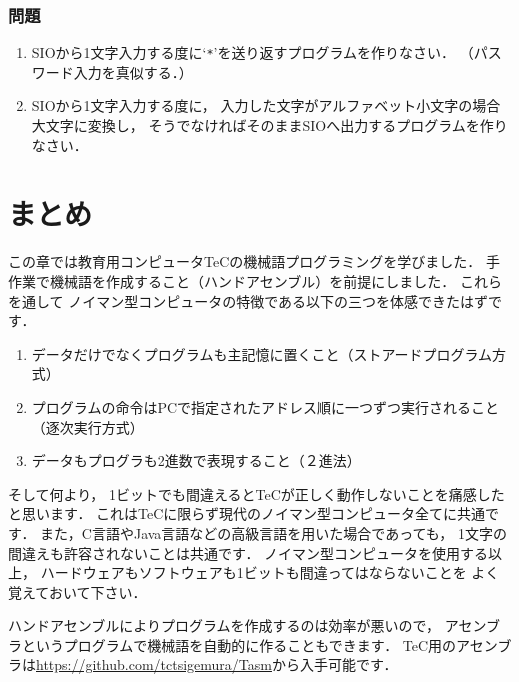\vfill
\subsubsection{問題}
\begin{enumerate}
\item SIOから1文字入力する度に`\texttt{*}'を送り返すプログラムを作りなさい．
  （パスワード入力を真似する．）
\item
  SIOから1文字入力する度に，
  入力した文字がアルファベット小文字の場合大文字に変換し，
  そうでなければそのままSIOへ出力するプログラムを作りなさい．
\end{enumerate}
\vfill

\section{まとめ}

この章では教育用コンピュータTeCの機械語プログラミングを学びました．
手作業で機械語を作成すること（ハンドアセンブル）を前提にしました．
これらを通して
ノイマン型コンピュータの特徴である以下の三つを体感できたはずです．

\begin{enumerate}
\item データだけでなくプログラムも主記憶に置くこと（ストアードプログラム方式）
\item プログラムの命令はPCで指定されたアドレス順に一つずつ実行されること
  （逐次実行方式）
\item データもプログラも2進数で表現すること（２進法）
\end{enumerate}

そして何より，
1ビットでも間違えるとTeCが正しく動作しないことを痛感したと思います．
これはTeCに限らず現代のノイマン型コンピュータ全てに共通です．
また，C言語やJava言語などの高級言語を用いた場合であっても，
1文字の間違えも許容されないことは共通です．
ノイマン型コンピュータを使用する以上，
ハードウェアもソフトウェアも1ビットも間違ってはならないことを
よく覚えておいて下さい．

ハンドアセンブルによりプログラムを作成するのは効率が悪いので，
アセンブラというプログラムで機械語を自動的に作ることもできます．
TeC用のアセンブラは\url{https://github.com/tctsigemura/Tasm}から入手可能です．
